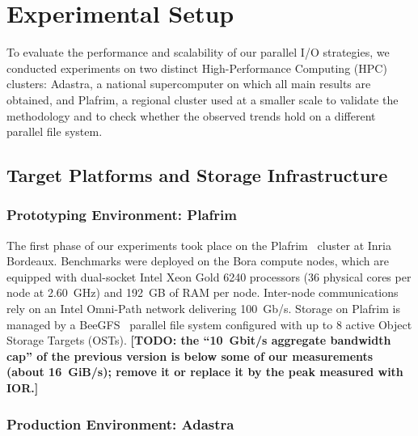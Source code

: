 \section{Experimental Setup}
\label{sec:setup}

To evaluate the performance and scalability of our parallel I/O strategies, we conducted
experiments on two distinct High-Performance Computing (HPC) clusters: Adastra, a national
supercomputer on which all main results are obtained, and Plafrim, a regional cluster used at a
smaller scale to validate the methodology and to check whether the observed trends hold on a
different parallel file system.

\subsection{Target Platforms and Storage Infrastructure}
\label{sec:platforms}

\subsubsection{Prototyping Environment: Plafrim}
\label{sec:plafrim}

The first phase of our experiments took place on the Plafrim~\cite{plafrim_inria} cluster at
Inria Bordeaux. Benchmarks were deployed on the Bora compute nodes, which are equipped with
dual-socket Intel Xeon Gold 6240 processors (36 physical cores per node at 2.60~GHz) and 192~GB of
RAM per node. Inter-node communications rely on an Intel Omni-Path network delivering 100~Gb/s.
Storage on Plafrim is managed by a BeeGFS~\cite{chowdhury2019characterization} parallel file system
configured with up to 8 active Object Storage Targets (OSTs).
\textbf{[TODO: the ``10~Gbit/s aggregate bandwidth cap'' of the previous version is below some of
our measurements (about 16~GiB/s); remove it or replace it by the peak measured with IOR.]}

\subsubsection{Production Environment: Adastra}
\label{sec:adastra}


